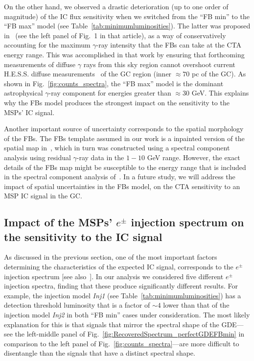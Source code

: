 \documentclass[doublespace,nopageskip]{VTthesis} %
\begin{document}
On the other hand, we observed a drastic deterioration (up to one order of magnitude) of the IC flux  sensitivity when we switched from the ``FB min'' to the ``FB max'' model (see Table~\ref{tab:minimumluminosities}). 
The latter was proposed in~\cite{Rinchiuso:2020skh} (see the left panel of Fig.~1 in that article), as a way of conservatively accounting for the maximum $\gamma$-ray intensity that the FBs can take at the CTA energy range. This was accomplished in that work by ensuring that forthcoming measurements of diffuse $\gamma$ rays from this sky region cannot overshoot current H.E.S.S. diffuse measurements~\citep{Abramowski:2016mir} of the GC region (inner $\approx 70$ pc of the GC). As shown in Fig.~\ref{fig:counts_spectra}, the ``FB max'' model is the dominant astrophysical $\gamma$-ray component for energies greater than $\approx 30$ GeV. This explains why the FBs model produces the strongest impact on the sensitivity to the MSPs' IC signal.

Another important source of uncertainty corresponds to the spatial morphology of the FBs. The FBs template assumed in our work is a inpainted version of the spatial map in~\cite{TheFermi-LAT:2017vmf}, which in turn was constructed using a spectral component analysis using residual $\gamma$-ray data in the $1-10$ GeV range. However, the exact details of the FBs map might be susceptible to the energy range that is included in the spectral component analysis of~\cite{TheFermi-LAT:2017vmf}. In a future study, we will address the impact of spatial uncertainties in the FBs model, on the CTA sensitivity to an MSP IC signal in the GC.  

\subsection{Impact of the MSPs' $e^\pm$ injection spectrum on the sensitivity to the IC signal}

As discussed in the previous section, one of the most important factors determining the characteristics of the expected IC signal, corresponds to the $e^\pm$ injection spectrum [see also~\citep{Song:2019nrx}]. In our analysis we  considered five different $e^\pm$ injection spectra, finding that these produce significantly different results. For example, the injection model \textit{Inj1} (see Table~\ref{tab:minimumluminosities}) has a detection threshold luminosity that is a factor of $\sim 4$
lower than that of the injection model \textit{Inj2} in both ``FB min'' cases under consideration. The most likely explanation for this is that signals that mirror the spectral shape of the GDE---see the left-middle panel of Fig.~\ref{fig:RecoveredSpectrum_perfectGDEFBmin} in comparison to the left panel of Fig.~\ref{fig:counts_spectra}---are more difficult
to disentangle than the signals that have a distinct spectral shape.
\end{document}
